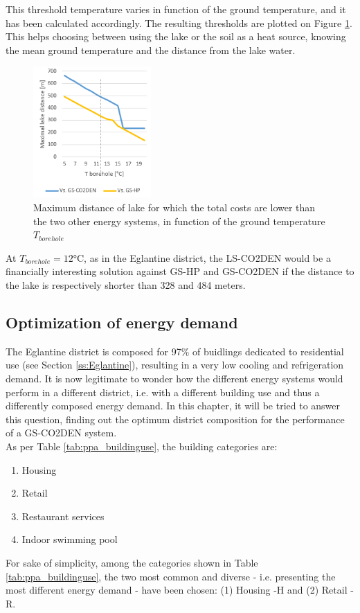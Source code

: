 \documentclass{article}
\begin{document}
This threshold temperature varies in function of the ground temperature, and it has been calculated accordingly. The resulting thresholds are plotted on Figure \ref{fig:lakeDist}. This helps choosing between using the lake or the soil as a heat source, knowing the mean ground temperature and the distance from the lake water.

\begin{figure}[htp]
	\centering
	\includegraphics[width=0.4\textwidth]{lakeDist.png}
	\caption{Maximum distance of lake for which the total costs are lower than the two other energy systems, in function of the ground temperature $T_{borehole}$}
	\label{fig:lakeDist}
\end{figure}

At $T_{borehole} = 12 \si{\celsius}$, as in the Eglantine district, the LS-CO2DEN would be a financially interesting solution against  GS-HP and GS-CO2DEN if the distance to the lake is respectively shorter than 328 and 484 meters.


\subsection{Optimization of energy demand}
The Eglantine district is composed for 97\% of buidlings dedicated to residential use (see Section \ref{ss:Eglantine}), resulting in a very low cooling and refrigeration demand. It is now legitimate to wonder how the different energy systems would perform in a different district, i.e. with a different building use and thus a differently composed energy demand. In this chapter, it will be tried to answer this question, finding out the optimum district composition for the performance of a GS-CO2DEN system.\\

As per Table \ref{tab:ppa_buildinguse}, the building categories are:
\begin{enumerate}
	\item Housing
	\item Retail
	\item Restaurant services
	\item Indoor swimming pool
\end{enumerate}
For sake of simplicity, among the categories shown in Table \ref{tab:ppa_buildinguse}, the two most common and diverse - i.e. presenting the most different energy demand - have been chosen: (1) Housing -H and (2) Retail - R. 
\end{document}
